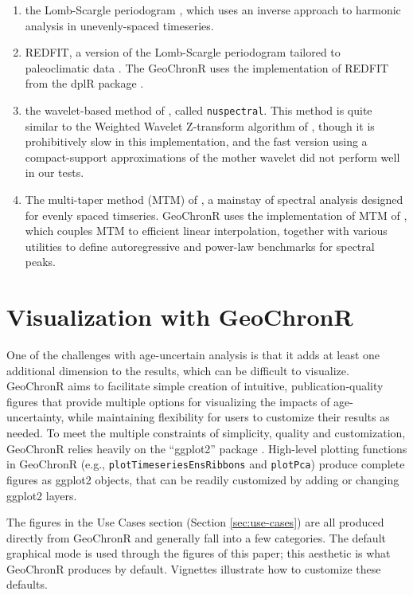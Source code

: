 \documentclass[gchron, manuscript]{copernicus}
\begin{document}
\begin{enumerate}
\def\labelenumi{\arabic{enumi}.}
\item
  the Lomb-Scargle periodogram \citep{VanderPlas_2018}, which uses an inverse approach to harmonic analysis in unevenly-spaced timeseries.
\item
  REDFIT, a version of the Lomb-Scargle periodogram tailored to paleoclimatic data \citep{SchulzMudelsee_02, Mudelsee_02, Mudelsee_NPG09}.
  The GeoChronR uses the implementation of REDFIT from the dplR package \citep{Bunn2008115}.
\item
  the wavelet-based method of \citet{Mathias_JSS04}, called \texttt{nuspectral}. This method is quite similar to the Weighted Wavelet Z-transform algorithm of \citet{Foster_AJ96}, though it is prohibitively slow in this implementation, and the fast version using a compact-support approximations of the mother wavelet did not perform well in our tests.
\item
  The multi-taper method (MTM) of \citet{thomson82}, a mainstay of spectral analysis \citep{Ghil02} designed for evenly spaced timseries.
  GeoChronR uses the implementation of MTM of \citet{astrochron}, which couples MTM to efficient linear interpolation, together with various utilities to define autoregressive and power-law benchmarks for spectral peaks.
\end{enumerate}

\hypertarget{sec:visualization}{%
\section{Visualization with GeoChronR}\label{sec:visualization}}

One of the challenges with age-uncertain analysis is that it adds at least one additional dimension to the results, which can be difficult to visualize.
GeoChronR aims to facilitate simple creation of intuitive, publication-quality figures that provide multiple options for visualizing the impacts of age-uncertainty, while maintaining flexibility for users to customize their results as needed.
To meet the multiple constraints of simplicity, quality and customization, GeoChronR relies heavily on the ``ggplot2'' package \citep{ggplot2}.
High-level plotting functions in GeoChronR (e.g., \texttt{plotTimeseriesEnsRibbons} and \texttt{plotPca}) produce complete figures as ggplot2 objects, that can be readily customized by adding or changing ggplot2 layers.

The figures in the Use Cases section (Section \ref{sec:use-cases}) are all produced directly from GeoChronR and generally fall into a few categories.
The default graphical mode is used through the figures of this paper; this aesthetic is what GeoChronR produces by default.
Vignettes illustrate how to customize these defaults.
\end{document}
